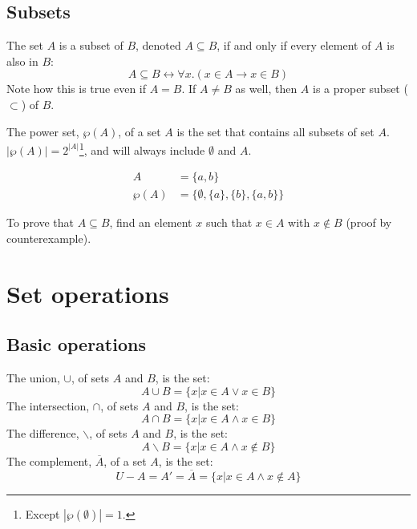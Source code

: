 \subsection{Subsets}
The set \(A\) is a subset of \(B\), denoted \(A \subseteq B\), if and only if every element of \(A\) is also in \(B\):
\begin{equation*}
    \label{eq:subset}
    A \subseteq B \leftrightarrow \forall x. (x \in A \rightarrow x \in B)
\end{equation*}
Note how this is true even if \(A = B\). If \(A \neq B\) as well, then \(A\) is a proper subset (\(\subset\)) of \(B\).

The power set, \(\wp(A)\), of a set \(A\) is the set that contains all subsets of set \(A\). \(|\wp(A)| = 2^{|A|}\)\footnote{Except \(|\wp(\emptyset)| = 1\).}, and will always include \(\emptyset\) and \(A\).
\begin{example}
    \begin{align*}
        A      & = \{a, b\}                              \\
        \wp(A) & = \{\emptyset, \{a\}, \{b\}, \{a, b\}\}
    \end{align*}
\end{example}
To prove that \(A \subseteq B\), find an element \(x\) such that \(x \in A\) with \(x \notin B\) (proof by counterexample).

\section{Set operations}
\subsection{Basic operations}
The union, \(\cup\), of sets \(A\) and \(B\), is the set:
\begin{equation*}
    A \cup B = \{x | x \in A \lor x \in B\}
\end{equation*}
The intersection, \(\cap\), of sets \(A\) and \(B\), is the set:
\begin{equation*}
    A \cap B = \{x | x \in A \land x \in B\}
\end{equation*}
The difference, \(\backslash\), of sets \(A\) and \(B\), is the set:
\begin{equation*}
    A \backslash B = \{x | x \in A \land x \notin B\}
\end{equation*}
The complement, \(\overline{A}\), of a set \(A\), is the set:
\begin{equation*}
    U - A = A' = \overline{A} = \{x | x \in A \land x \notin A\}
\end{equation*}
